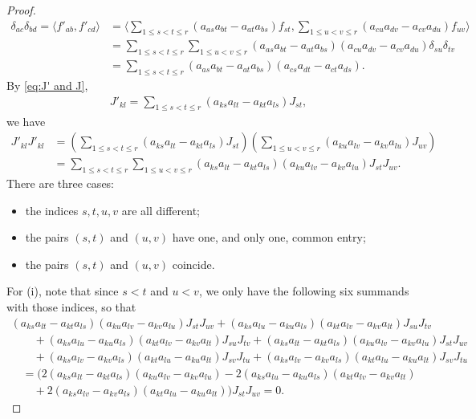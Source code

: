 \documentclass[pdftex]{sigma}
\numberwithin{equation}{section}
\begin{document}
\begin{proof}
\begin{align}
\delta_{ac}\delta_{bd}=\langle f'_{ab},f'_{cd}\rangle& =\bigg\langle \sum_{1\leq s< t\leq r}(a_{as}a_{bt} -a_{at}a_{bs})f_{st},
\sum_{1\leq u< v\leq r}(a_{cu}a_{dv} -a_{cv}a_{du})f_{uv}\bigg\rangle \nonumber\\
 &=\sum_{1\leq s< t\leq r}\sum_{1\leq u< v\leq r}(a_{as}a_{bt} -a_{at}a_{bs})
(a_{cu}a_{dv} -a_{cv}a_{du})\delta_{su}\delta_{tv}\nonumber\\
 &=\sum_{1\leq s< t\leq r}(a_{as}a_{bt} -a_{at}a_{bs})(a_{cs}a_{dt} -a_{ct}a_{ds}). \label{eq:orthononality-ext2}
\end{align}
By \eqref{eq:J' and J},
\begin{gather*}
 J'_{kl} = \sum_{1\leq s< t\leq r}(a_{ks}a_{lt} -a_{kt}a_{ls})J_{st},
\end{gather*}
we have
\begin{align*}
 J'_{kl} J'_{kl} &= \left(\sum_{1\leq s< t\leq r}(a_{ks}a_{lt} -a_{kt}a_{ls})
J_{st}\right) \left(\sum_{1\leq u< v\leq r}(a_{ku}a_{lv} -a_{kv}a_{lu})J_{uv}\right)\\
 &=\sum_{1\leq s< t\leq r}\sum_{1\leq u< v\leq r}(a_{ks}a_{lt} -a_{kt}a_{ls})(a_{ku}a_{lv} -a_{kv}a_{lu})J_{st}J_{uv}.
\end{align*}
There are three cases:
\begin{itemize}\itemsep=0pt
 \item[(i)] the indices $s,t,u,v$ are all different;
 \item[(ii)] the pairs $(s,t)$ and $(u,v)$ have one, and only one, common entry;
 \item[(iii)] the pairs $(s,t)$ and $(u,v)$ coincide.
\end{itemize}

For (i), note that since $s<t$ and $u<v$, we only have the following six summands with those indices, so that
\begin{gather*}
 (a_{k s} a_{l t} - a_{k t} a_{l s}) (a_{k u} a_{l v} - a_{k v} a_{l u}) J_{s t} J_{u v}
+ (a_{k s} a_{l u} - a_{k u} a_{l s}) (a_{k t} a_{l v} - a_{k v} a_{l t}) J_{s u} J_{t v} \\
\qquad {} + (a_{k s} a_{l u} - a_{k u} a_{l s})
 (a_{k t} a_{l v} - a_{k v} a_{l t}) J_{s u} J_{t v} + (a_{k s} a_{l t} - a_{k t} a_{l s})
 (a_{k u} a_{l v} - a_{k v} a_{l u}) J_{s t} J_{u v} \\
\qquad {} + (a_{k s} a_{l v} - a_{k v} a_{l s})
 (a_{k t} a_{l u} - a_{k u} a_{l t}) J_{s v} J_{t u}
+ (a_{k s} a_{l v} - a_{k v} a_{l s})
 (a_{k t} a_{l u} - a_{k u} a_{l t}) J_{s v} J_{t u}\\
\quad{} = (2(a_{ks}a_{lt}-a_{kt}a_{ls})(a_{ku}a_{lv}-a_{kv}a_{lu}) -2(a_{ks}a_{lu}-a_{ku}a_{ls})(a_{kt}a_{l v }-a_{kv}a_{lt})\\
 \qquad{} +2(a_{ks}a_{lv}-a_{kv}a_{ls})(a_{kt}a_{lu}-a_{ku}a_{lt}))J_{s t} J_{u v} = 0.
\end{gather*}


\end{proof}
\end{document}
